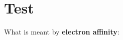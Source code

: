 \documentclass{article}
\begin{document}
\section{Test}

\begin{myex}
  What is meant by \textbf{electron affinity}:
  \lipsum[3]
\end{myex} 
\end{document}
